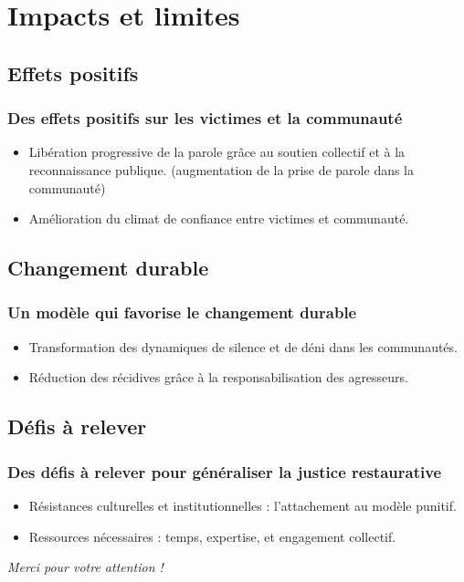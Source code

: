 \documentclass[french]{beamer}
\begin{document}
\section{Impacts et limites}
\subsection{Effets positifs}
\begin{frame}
  \frametitle{Des effets positifs sur les victimes et la communauté}
  \begin{itemize}
    \item Libération progressive de la parole grâce au soutien collectif et à la reconnaissance publique. (augmentation de la prise de parole dans la communauté)
    \item Amélioration du climat de confiance entre victimes et communauté.
  \end{itemize}
\end{frame}

\subsection{Changement durable}
\begin{frame}
  \frametitle{Un modèle qui favorise le changement durable}
  \begin{itemize}
    \item Transformation des dynamiques de silence et de déni dans les communautés.
    \item Réduction des récidives grâce à la responsabilisation des agresseurs.
  \end{itemize}
\end{frame}

\subsection{Défis à relever}
\begin{frame}
  \frametitle{Des défis à relever pour généraliser la justice restaurative}
  \begin{itemize}
    \item Résistances culturelles et institutionnelles : l’attachement au modèle punitif.
    \item Ressources nécessaires : temps, expertise, et engagement collectif.
  \end{itemize}
\end{frame}

\begin{frame}[plain]
  \addtocounter{framenumber}{-1}
  \begin{center}
    \huge
    \textit{Merci pour votre attention !}
  \end{center}
\end{frame}

\appendix
\AtBeginSection{
}

\begin{frame}[allowframebreaks]
  \frametitle{\refname}
   
\end{frame}
\end{document}
